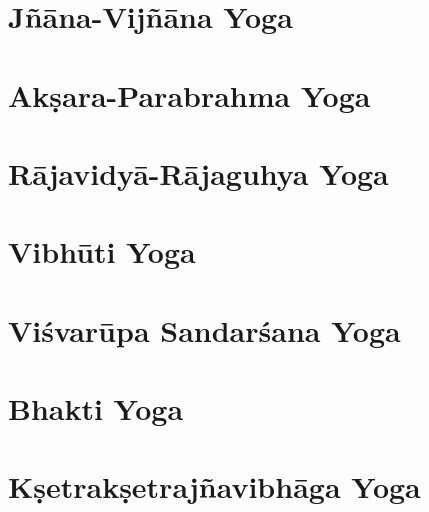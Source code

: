\documentclass{scrbook}
\begin{document}
\chapter{Jñāna-Vijñāna Yoga}
\begin{multicols}{2}
    
\end{multicols}

\chapter{Akṣara-Parabrahma Yoga}
\begin{multicols}{2}
    
\end{multicols}

\chapter{Rājavidyā-Rājaguhya Yoga}
\begin{multicols}{2}
    
\end{multicols}

\chapter{Vibhūti Yoga}
\begin{multicols}{2}
    
\end{multicols}

\chapter{Viśvarūpa Sandarśana Yoga}
\begin{multicols}{2}
    
\end{multicols}

\chapter{Bhakti Yoga}
\begin{multicols}{2}
    
\end{multicols}

\chapter{Kṣetrakṣetrajñavibhāga Yoga}
\begin{multicols}{2}
    
\end{multicols}
\end{document}
